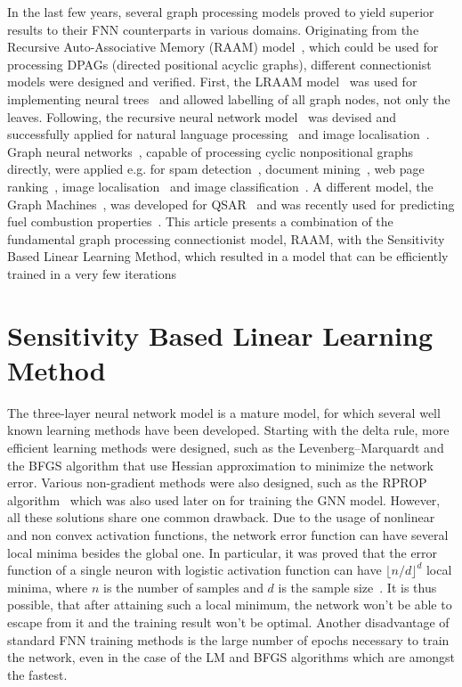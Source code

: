 \documentclass[]{spie}  %
\begin{document}
In the last few years, several graph processing models proved to yield superior results to their FNN counterparts in various domains. Originating from the Recursive Auto-Associative Memory (RAAM) model~\cite{pollack1990recursive}, which could be used for processing DPAGs (directed positional acyclic graphs), different connectionist models were designed and verified. First, the LRAAM model~\cite{sperduti1994labelling} was used for implementing neural trees~\cite{sperduti1993example} and allowed labelling of all graph nodes, not only the leaves. Following, the recursive neural network model~\cite{frasconi1998general} was devised and successfully applied for natural language processing~\cite{costa2003towards} and image localisation~\cite{bianchini2005recursive}. Graph neural networks~\cite{scarselli2009graph}, capable of processing cyclic nonpositional graphs directly, were applied e.g. for spam detection~\cite{scarselli2013solving}, document mining~\cite{yong2006xml}, web page ranking~\cite{scarselli2005graph}, image localisation~\cite{monfardini2006graph} and image classification~\cite{quek2011structural}. A different model, the Graph Machines~\cite{goulon2005learning}, was developed for QSAR~\cite{goulon2011novel} and was recently used for predicting fuel combustion properties~\cite{saldana2013rational}. This article presents a combination of the fundamental graph processing connectionist model, RAAM, with the Sensitivity Based Linear Learning Method, which resulted in a model that can be efficiently trained in a very few iterations

\section{Sensitivity Based Linear Learning Method}
The three-layer neural network model is a mature model, for which several well known learning methods have been developed. Starting with the delta rule, more efficient learning methods were designed, such as the Levenberg–Marquardt and the BFGS algorithm that use Hessian approximation to minimize the network error. Various non-gradient methods were also designed, such as the RPROP algorithm~\cite{riedmiller1993direct} which was also used later on for training the GNN model. However, all these solutions share one common drawback. Due to the usage of nonlinear and non convex activation functions, the network error function can have several local minima besides the global one. In particular, it was proved that the error function of a single neuron with logistic activation function can have $\lfloor n/d \rfloor^{d}$ local minima, where $n$ is the number of samples and $d$ is the sample size~\cite{auer1996exponentially}. It is thus possible, that after attaining such a local minimum, the network won't be able to escape from it and the training result won't be optimal. Another disadvantage of standard FNN training methods is the large number of epochs necessary to train the network, even in the case of the LM and BFGS algorithms which are amongst the fastest.
\end{document}

